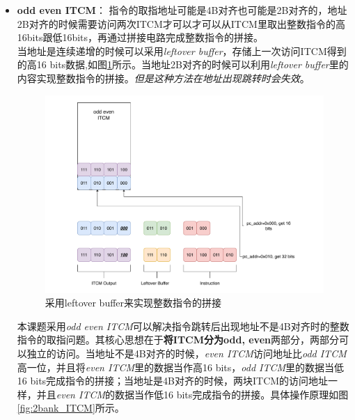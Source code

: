 \documentclass[a4paper, 12pt]{article}
\begin{document}
\begin{itemize}
  \item \textbf{odd even ITCM}：
    指令的取指地址可能是4B对齐也可能是2B对齐的，地址2B对齐的时候需要访问两次ITCM才可以才可以从ITCM里取出整数指令的高16bits跟低16bits，再通过拼接电路完成整数指令的拼接。\\ 
    当地址是连续递增的时候可以采用\textit{leftover buffer}\cite{kowarschik2003overview}，存储上一次访问ITCM得到的高16 bits数据,如图\ref{fig:if_leftover_buffer}所示。当地址2B对齐的时候可以利用\textit{leftover buffer}里的内容实现整数指令的拼接。\textit{但是这种方法在地址出现跳转时会失效}。
    \begin{figure}[htbp]
      \centering
      \includegraphics[width=0.8\linewidth]{./images/if_leftover_buffer.pdf}
      \caption{采用leftover buffer来实现整数指令的拼接}
      \label{fig:if_leftover_buffer}
    \end{figure}
    本课题采用\textit{odd even ITCM}可以解决指令跳转后出现地址不是4B对齐时的整数指令的取指问题。其核心思想在于\textbf{将ITCM分为odd, even}两部分，两部分可以独立的访问。当地址不是4B对齐的时候，\textit{even ITCM}访问地址比\textit{odd ITCM}高一位，并且将\textit{even ITCM}里的数据当作高16 bits，\textit{odd ITCM}里的数据当低16 bits完成指令的拼接；当地址是4B对齐的时候，两块ITCM的访问地址一样，并且\textit{even ITCM}的数据当作低16 bits完成指令的拼接。具体操作原理如图\ref{fig:2bank_ITCM}所示。


\end{itemize}
\end{document}

